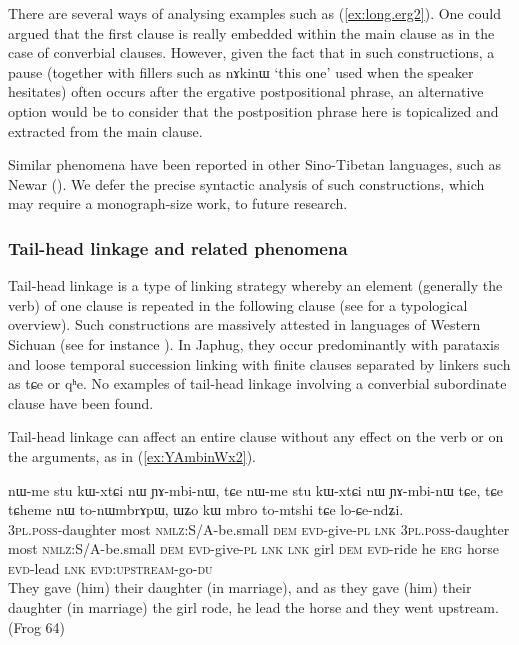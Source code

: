 \documentclass[oldfontcommands,oneside,a4paper,11pt]{article}
\newcommand{\ipa}[1]{{\phon \mbox{#1}}} %
\newcommand{\refb}[1]{(\ref{#1})}
\begin{document}
There are several ways of analysing examples such as \refb{ex:long.erg2}. One could argued that the first clause is really embedded within the main clause as in the case of converbial clauses. However, given the fact that in such constructions, a pause (together with fillers such as \ipa{nɤkinɯ} `this one' used when the speaker hesitates) often occurs after the ergative postpositional phrase, an alternative option would be to consider that the postposition phrase here is topicalized and extracted from the main clause. 

 Similar phenomena have been reported in other Sino-Tibetan languages, such as Newar (\citealt{genetti88syntactic}). We defer the precise syntactic analysis of such constructions, which may require a monograph-size work, to future research. 



\subsubsection{Tail-head linkage and related phenomena}
Tail-head linkage is a type of linking strategy whereby an element (generally the verb) of one clause  is repeated in the following clause (see \citealt{vries05tailhead} for a typological overview). Such constructions are massively attested in languages of Western Sichuan (see for instance \citealt[688-693]{zhangsh13ersu}). In Japhug, they occur predominantly with parataxis and loose temporal succession linking with finite clauses separated by linkers such as \ipa{tɕe} or \ipa{qʰe}. No examples of tail-head linkage involving a converbial subordinate clause have been found.

Tail-head linkage can affect an entire clause without any effect on the verb or on the arguments, as  in \refb{ex:YAmbinWx2}.

\begin{exe}
\ex \label{ex:YAmbinWx2}
\gll
\ipa{nɯ-me} 	\ipa{stu} 	\ipa{kɯ-xtɕi} 	\ipa{nɯ} 	\ipa{ɲɤ-mbi-nɯ,} 	\ipa{tɕe} 	\ipa{nɯ-me} 	\ipa{stu} 	\ipa{kɯ-xtɕi} 	\ipa{nɯ} 	\ipa{ɲɤ-mbi-nɯ} 	\ipa{tɕe,} 	\ipa{tɕe} 	\ipa{tɕheme} 	\ipa{nɯ} 	\ipa{to-nɯmbrɤpɯ,} 	\ipa{ɯʑo} 	\ipa{kɯ} 	\ipa{mbro} 	\ipa{to-mtshi} 	\ipa{tɕe} 	\ipa{lo-ɕe-ndʑi.} \\
\textsc{3pl.poss}-daughter most \textsc{nmlz}:S/A-be.small \textsc{dem} \textsc{evd}-give-\textsc{pl}  \textsc{lnk} \textsc{3pl.poss}-daughter most \textsc{nmlz}:S/A-be.small \textsc{dem} \textsc{evd}-give-\textsc{pl}  \textsc{lnk}  \textsc{lnk} girl \textsc{dem} \textsc{evd}-ride he \textsc{erg} horse \textsc{evd}-lead \textsc{lnk} \textsc{evd:upstream}-go-\textsc{du} \\
\glt They gave (him) their daughter (in marriage), and as they gave (him) their daughter (in marriage)  the girl rode, he lead the horse and they went upstream. (Frog 64)
\end{exe}
\end{document}
